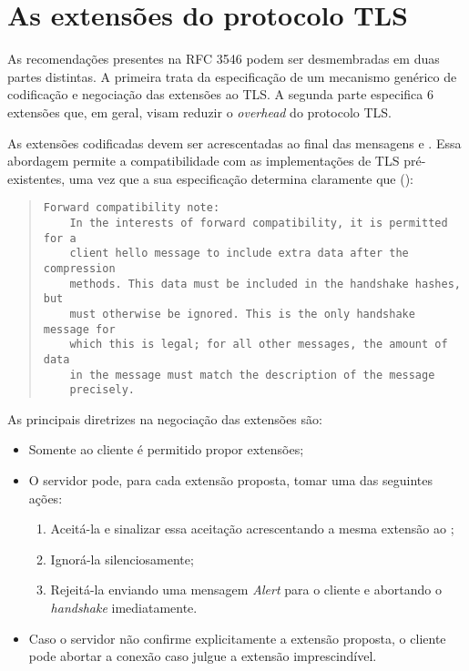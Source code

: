 
\chapter{As extensões do protocolo TLS}

As recomendações presentes na RFC 3546 podem ser desmembradas em duas 
partes distintas. A primeira trata da especificação de um mecanismo genérico 
de codificação e negociação das extensões ao TLS. A segunda parte especifica
6 extensões que, em geral, visam reduzir o \emph{overhead} do protocolo TLS.

As extensões codificadas devem ser acrescentadas ao final das mensagens 
\tlsHsCh e \tlsHsSh. Essa abordagem permite a compatibilidade com 
as implementações de TLS pré-existentes, uma vez que a sua 
especificação determina claramente que ():
 
\begin{quote}
{\smaller
\begin{verbatim}
Forward compatibility note: 
    In the interests of forward compatibility, it is permitted for a 
    client hello message to include extra data after the compression 
    methods. This data must be included in the handshake hashes, but 
    must otherwise be ignored. This is the only handshake message for 
    which this is legal; for all other messages, the amount of data 
    in the message must match the description of the message 
    precisely.
\end{verbatim}
}
\end{quote}

As principais diretrizes na negociação das extensões são:

\begin{itemize}
\item Somente ao cliente é permitido propor extensões;
\item O servidor pode, para cada extensão proposta, tomar uma das seguintes ações:
\begin{enumerate}
    \item Aceitá-la e sinalizar essa aceitação acrescentando a mesma extensão
    ao \tlsHsSh;
    \item Ignorá-la silenciosamente;
    \item Rejeitá-la enviando uma mensagem \emph{Alert} para o cliente e
    abortando o \emph{handshake} imediatamente.
\end{enumerate}
\item Caso o servidor não confirme explicitamente a extensão proposta, o
cliente pode abortar a conexão caso julgue a extensão imprescindível.
\end{itemize}

